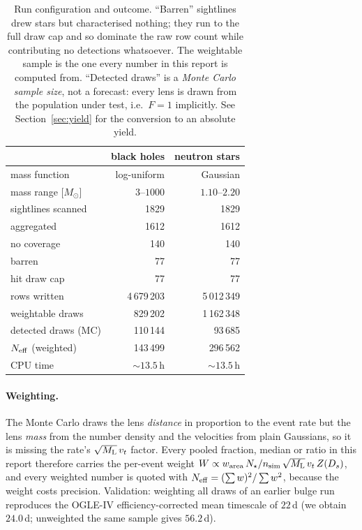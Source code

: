 \documentclass[english,10pt,a4paper]{article}
\newcommand{\Ml}{M_{\rm L}}
\newcommand{\Msun}{M_\odot}
\newcommand{\Neff}{N_{\rm eff}}
\begin{document}
\begin{table}[h]
\centering
\caption{Run configuration and outcome. ``Barren'' sightlines drew stars but characterised
nothing; they run to the full draw cap and so dominate the raw row count while contributing no
detections whatsoever. The weightable sample is the one every number in this report is computed
from. ``Detected draws'' is a \emph{Monte Carlo sample size}, not a forecast: every lens is drawn
from the population under test, i.e.\ $F=1$ implicitly. See Section~\ref{sec:yield} for the
conversion to an absolute yield.}
\label{tab:runs}
\begin{tabular}{lrr}
\toprule
 & black holes & neutron stars \\
\midrule
mass function            & log-uniform          & Gaussian \citep{OzelFreire2016} \\
mass range [$\Msun$]     & $3$--$1000$          & $1.10$--$2.20$ \\
sightlines scanned       & 1829                 & 1829 \\
\quad aggregated         & 1612                 & 1612 \\
\quad no coverage        & 140                  & 140 \\
\quad barren             & 77                   & 77 \\
\quad hit draw cap       & 77                   & 77 \\
rows written             & 4\,679\,203          & 5\,012\,349 \\
weightable draws         & 829\,202             & 1\,162\,348 \\
detected draws (MC)      & 110\,144             & 93\,685 \\
$\Neff$ (weighted)       & 143\,499             & 296\,562 \\
CPU time                 & $\sim\!13.5$\,h      & $\sim\!13.5$\,h \\
\bottomrule
\end{tabular}
\end{table}

\paragraph{Weighting.} The Monte Carlo draws the lens \emph{distance} in proportion to the event
rate but the lens \emph{mass} from the number density and the velocities from plain Gaussians,
so it is missing the rate's $\sqrt{\Ml}\,v_t$ factor. Every pooled fraction, median or ratio in
this report therefore carries the per-event weight
$W \propto w_{\rm area}\,N_\star/n_{\rm sim}\,\sqrt{\Ml}\,v_t\,Z(D_s)$, and every weighted number
is quoted with $\Neff = (\sum w)^2/\sum w^2$, because the weight costs precision. Validation:
weighting all draws of an earlier bulge run reproduces the OGLE-IV efficiency-corrected mean
timescale of $22$\,d (we obtain $24.0$\,d; unweighted the same sample gives $56.2$\,d).
\end{document}
